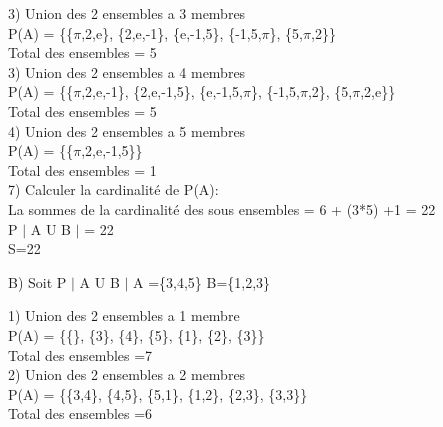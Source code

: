 3) Union des 2 ensembles a 3 membres \\

P(A) = \{\{$\pi$,2,e\}, \{2,e,-1\}, \{e,-1,5\}, \{-1,5,$\pi$\}, \{5,$\pi$,2\}\} \\

Total des ensembles = 5 \\

3) Union des 2 ensembles a 4 membres \\

P(A) = \{\{$\pi$,2,e,-1\}, \{2,e,-1,5\}, \{e,-1,5,$\pi$\}, \{-1,5,$\pi$,2\}, \{5,$\pi$,2,e\}\} \\

Total des ensembles = 5 \\

4) Union des 2 ensembles a 5 membres \\

P(A) = \{\{$\pi$,2,e,-1,5\}\} \\

Total des ensembles = 1 \\

7) Calculer la cardinalité de P(A): \\

La sommes de la cardinalité des sous ensembles = 6 + (3*5) +1 = 22 \\

P $|$ A U B $|$ = 22 \\

S=22 \\

\newpage

B) Soit P $|$ A U B $|$ A =\{3,4,5\} B=\{1,2,3\} \\
\vspace{5mm} %

1) Union des 2 ensembles a 1 membre \\

P(A) = \{\{\}, \{3\}, \{4\}, \{5\}, \{1\}, \{2\}, \{3\}\} \\

Total des ensembles =7 \\

2) Union des 2 ensembles a 2 membres \\

P(A) = \{\{3,4\}, \{4,5\}, \{5,1\}, \{1,2\}, \{2,3\}, \{3,3\}\} \\

Total des ensembles =6 \\

